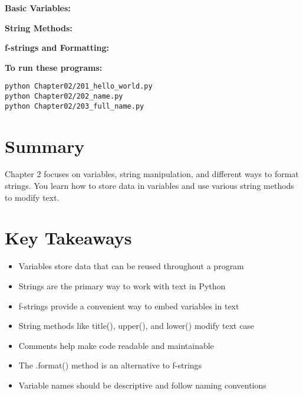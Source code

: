 \textbf{Basic Variables:}


\textbf{String Methods:}


\textbf{f-strings and Formatting:}


\textbf{To run these programs:}
\begin{verbatim}
python Chapter02/201_hello_world.py
python Chapter02/202_name.py
python Chapter02/203_full_name.py
\end{verbatim}

\section*{Summary}
Chapter 2 focuses on variables, string manipulation, and different ways to format strings. You learn how to store data in variables and use various string methods to modify text.

\section*{Key Takeaways}
\begin{itemize}
    \item Variables store data that can be reused throughout a program
    \item Strings are the primary way to work with text in Python
    \item f-strings provide a convenient way to embed variables in text
    \item String methods like title(), upper(), and lower() modify text case
    \item Comments help make code readable and maintainable
    \item The .format() method is an alternative to f-strings
    \item Variable names should be descriptive and follow naming conventions
\end{itemize} 